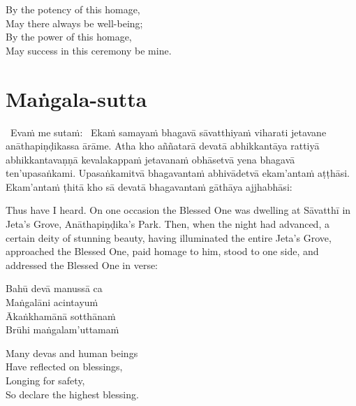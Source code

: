 \begin{english-verses}
  By the potency of this homage,\\
  May there always be well-being;\\
  By the power of this homage,\\
  May success in this ceremony be mine.
\end{english-verses}

\suttaRef{[Thai]}



\section{Maṅgala-sutta}
\label{mangala-sutta}

\begin{pali-hangtogether}
  \anglebracketleft\ \hspace{-0.5mm}Evaṁ me sutaṁ: \hspace{-0.5mm}\anglebracketright\   Ekaṁ samayaṁ bhagavā sāvatthiyaṁ viharati jetavane anāthapiṇḍikassa ārāme. Atha kho aññatarā devatā abhikkantāya rattiyā abhikkantavaṇṇā kevalakappaṁ jetavanaṁ obhāsetvā yena bhagavā ten'upasaṅkami. Upasaṅkamitvā bhagavantaṁ abhivādetvā ekam'antaṁ aṭṭhāsi. Ekam'antaṁ ṭhitā kho sā devatā bhagavantaṁ gāthāya ajjhabhāsi:
\end{pali-hangtogether}

\begin{english-verses}
  Thus have I heard. On one occasion the Blessed One was dwelling at Sāvatthī in Jeta's Grove, Anāthapiṇḍika's Park. Then, when the night had advanced, a certain deity of stunning beauty, having illuminated the entire Jeta's Grove, approached the Blessed One, paid homage to him, stood to one side, and addressed the Blessed One in verse:
\end{english-verses}

\begin{pali-hang}
  Bahū devā manussā ca\\
  Maṅgalāni acintayuṁ\\
  Ākaṅkhamānā sotthānaṁ\\
  Brūhi maṅgalam'uttamaṁ
\end{pali-hang}

\begin{english-verses}
  Many devas and human beings\\
  Have reflected on blessings,\\
  Longing for safety,\\
  So declare the highest blessing.
\end{english-verses}

